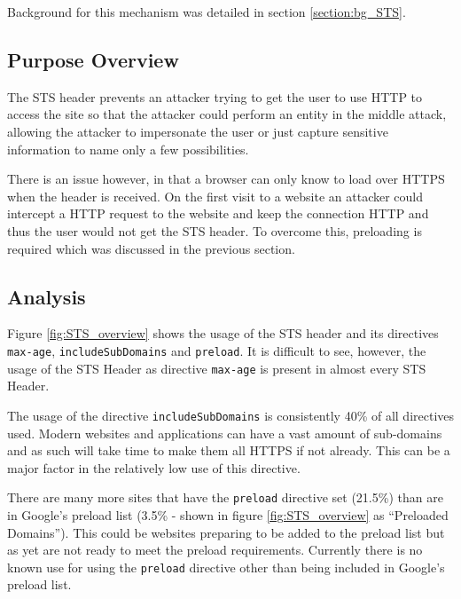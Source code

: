 \documentclass{mscreport}
\begin{document}
Background for this mechanism was detailed in section \ref{section:bg_STS}.

\subsection{Purpose Overview}

\noindent
The STS header prevents an attacker trying to get the user to use HTTP to access the site so that the attacker could perform an entity in the middle attack, allowing the attacker to impersonate the user or just capture sensitive information to name only a few possibilities.

\vspace{0.3cm} \noindent
There is an issue however, in that a browser can only know to load over HTTPS when the header is received. On the first visit to a website an attacker could intercept a HTTP request to the website and keep the connection HTTP and thus the user would not get the STS header. To overcome this, preloading is required which was discussed in the previous section.


\subsection{Analysis}


\noindent
Figure \ref{fig:STS_overview} shows the usage of the STS header and its directives \texttt{max-age},  \texttt{includeSubDomains} and \texttt{preload}. It is difficult to see, however, the usage of the STS Header as directive \texttt{max-age} is present in almost every STS Header.

\vspace{0.3cm} \noindent
The usage of the directive \texttt{includeSubDomains} is consistently 40\% of all directives used. Modern websites and applications can have a vast amount of sub-domains and as such will take time to make them all HTTPS if not already. This can be a major factor in the relatively low use of this directive.

\vspace{0.3cm} \noindent
There are many more sites that have the \texttt{preload} directive set (21.5\%) than are in Google's preload list (3.5\% - shown in figure \ref{fig:STS_overview} as ``Preloaded Domains''). This could be websites preparing to be added to the preload list but as yet are not ready to meet the preload requirements. Currently there is no known use for using the \texttt{preload} directive other than being included in Google's preload list.
\end{document}
